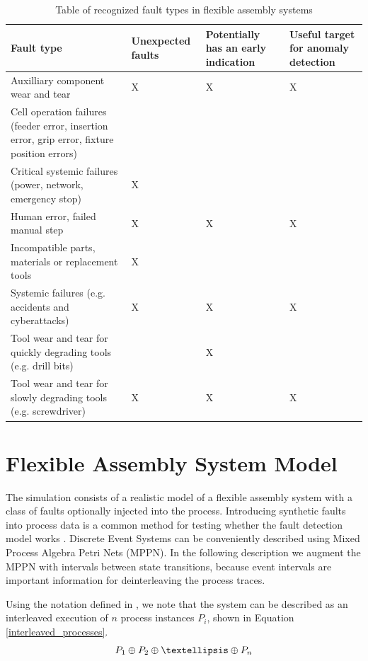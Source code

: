 \documentclass[journal]{IEEEtran}
\begin{document}
\begin{table}[!t]
\renewcommand{\arraystretch}{1.3}
\caption{Table of recognized fault types in flexible assembly systems}
\label{faults}
\centering
\begin{tabular}{|p{25mm}|p{15mm}|p{15mm}|p{15mm}|}
\hline
Fault type & Unexpected faults & Potentially has an early indication & Useful target for anomaly detection \\
\hline
\hline
Auxilliary component wear and tear & X & X & X \\
\hline
Cell operation failures (feeder error, insertion error, grip error, fixture position errors) & & & \\
\hline
Critical systemic failures (power, network, emergency stop) & X & & \\
\hline
Human error, failed manual step & X & X & X \\
\hline
Incompatible parts, materials or replacement tools & X & & \\
\hline
Systemic failures (e.g. accidents and cyberattacks) & X & X & X \\
\hline
Tool wear and tear for quickly degrading tools (e.g. drill bits) & & X & \\
\hline
Tool wear and tear for slowly degrading tools (e.g. screwdriver) & X & X & X \\
\hline
\end{tabular}
\end{table}

\section{Flexible Assembly System Model}

The simulation consists of a realistic model of a flexible assembly system with a class of faults optionally injected into the process.
Introducing synthetic faults into process data is a common method for testing whether the fault detection model works \cite{able2016model}.
Discrete Event Systems can be conveniently
described using Mixed Process Algebra Petri Nets (MPPN)\cite{falkman2001modeling}. In the following description we augment the MPPN with intervals between state transitions,
because event intervals are important information for deinterleaving the process traces.

Using the notation defined in \cite{falkman2001combined}, we note that the system can be described as an interleaved execution of $ n $ process instances $ P_i $, shown in
Equation \ref{interleaved_processes}.
\begin{equation}
 P_1 \oplus P_2 \oplus \textellipsis \oplus P_n
 \label{interleaved_processes}
\end{equation}
\end{document}
